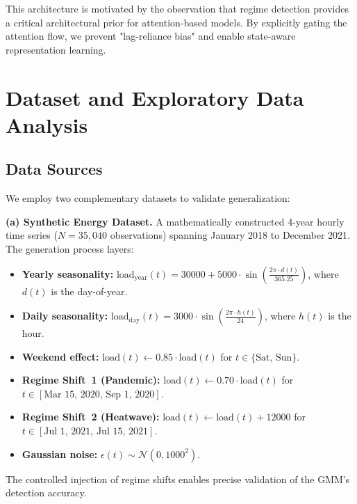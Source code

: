 \documentclass[conference, 10pt]{IEEEtran}
\begin{document}
This architecture is motivated by the observation that regime detection provides a critical architectural prior for attention-based models. By explicitly gating the attention flow, we prevent "lag-reliance bias" and enable state-aware representation learning.

\section{Dataset and Exploratory Data Analysis}

\subsection{Data Sources}

We employ two complementary datasets to validate generalization:

\textbf{(a) Synthetic Energy Dataset.} A mathematically constructed 4-year hourly time series ($N = 35{,}040$ observations) spanning January 2018 to December 2021. The generation process layers:
\begin{itemize}
    \item \textbf{Yearly seasonality:} $\text{load}_\text{year}(t) = 30000 + 5000 \cdot \sin\!\left(\frac{2\pi \cdot d(t)}{365.25}\right)$, where $d(t)$ is the day-of-year.
    \item \textbf{Daily seasonality:} $\text{load}_\text{day}(t) = 3000 \cdot \sin\!\left(\frac{2\pi \cdot h(t)}{24}\right)$, where $h(t)$ is the hour.
    \item \textbf{Weekend effect:} $\text{load}(t) \leftarrow 0.85 \cdot \text{load}(t)$ for $t \in \{\text{Sat, Sun}\}$.
    \item \textbf{Regime Shift~1 (Pandemic):} $\text{load}(t) \leftarrow 0.70 \cdot \text{load}(t)$ for $t \in [\text{Mar 15, 2020},\, \text{Sep 1, 2020}]$.
    \item \textbf{Regime Shift~2 (Heatwave):} $\text{load}(t) \leftarrow \text{load}(t) + 12000$ for $t \in [\text{Jul 1, 2021},\, \text{Jul 15, 2021}]$.
    \item \textbf{Gaussian noise:} $\epsilon(t) \sim \mathcal{N}(0, 1000^2)$.
\end{itemize}

The controlled injection of regime shifts enables precise validation of the GMM's detection accuracy.
\end{document}
